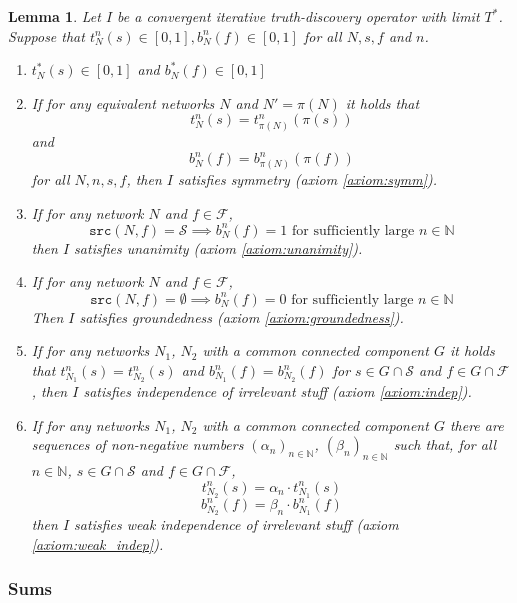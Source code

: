 \documentclass{article}
\theoremstyle{definition} \newtheorem{definition}{Definition}
\theoremstyle{definition} \newtheorem{example}{Example}
\theoremstyle{plain} \newtheorem{axiom}{Axiom}
\theoremstyle{plain} \newtheorem*{remark}{Remark}
\theoremstyle{remark} \newtheorem*{notation}{Notation}
\theoremstyle{plain} \newtheorem{lemma}{Lemma}
\theoremstyle{plain} \newtheorem{theorem}{Theorem}
\theoremstyle{plain} \newtheorem{proposition}{Proposition}
\renewcommand{\S}{\mathcal{S}}  %
\newcommand{\F}{\mathcal{F}}
\newcommand{\Nat}{\mathbb{N}}
\newcommand{\src}{\texttt{src}}
\begin{document}
\begin{lemma}
\label{lemma:iterative_axiom_suff_conds}
Let $I$ be a convergent iterative truth-discovery operator with limit
$T^*$. Suppose that $t_N^n(s) \in [0, 1], b_N^n(f) \in [0, 1]$ for all $N, s,
f$ and $n$.

\begin{enumerate}
    \item $t_N^*(s) \in [0, 1]$ and $b_N^*(f) \in [0, 1]$

    \item If for any equivalent networks $N$ and $N'=\pi(N)$ it holds that
    \[
        t_N^n(s) = t_{\pi(N)}^n(\pi(s))
    \]
    and
    \[
        b_N^n(f) = b_{\pi(N)}^n(\pi(f))
    \]
    for all $N, n, s, f$, then $I$ satisfies symmetry (axiom \ref{axiom:symm}).

    \item If for any network $N$ and $f \in \F$,
    \[
        \src(N, f) = \S \implies b_N^n(f) = 1 \text{ for sufficiently large }
            n \in \Nat
    \]
    then $I$ satisfies unanimity (axiom \ref{axiom:unanimity}).

    \item If for any network $N$ and $f \in \F$,
    \[
        \src(N, f) = \emptyset \implies b_N^n(f) = 0
            \text{ for sufficiently large } n \in \Nat
    \]
    Then $I$ satisfies groundedness (axiom \ref{axiom:groundedness}).

    \item If for any networks $N_1$, $N_2$ with a common connected component
    $G$ it holds that $t_{N_1}^n(s) = t_{N_2}^n(s)$ and $b_{N_1}^n(f) =
    b_{N_2}^n(f)$ for $s \in G \cap \S$ and $f \in G \cap \F$, then $I$
    satisfies independence of irrelevant stuff (axiom \ref{axiom:indep}).

    \item If for any networks $N_1$, $N_2$ with a common connected component
    $G$ there are sequences of non-negative numbers $(\alpha_n)_{n \in \Nat}$,
    $(\beta_n)_{n \in \Nat}$ such that, for all $n \in \Nat$, $s \in G \cap \S$
    and $f \in G \cap \F$,
        \[ t_{N_2}^n(s) = \alpha_n \cdot t_{N_1}^n(s) \]
        \[ b_{N_2}^n(f) = \beta_n \cdot b_{N_1}^n(f) \]
    then $I$ satisfies weak independence of irrelevant stuff (axiom
    \ref{axiom:weak_indep}).

\end{enumerate}
\end{lemma}

\subsubsection{Sums}
\end{document}

